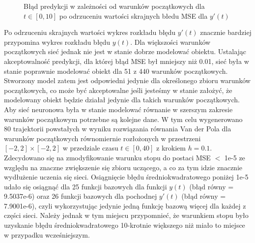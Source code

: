\begin{figure}[ht!]
	\centering

	

	\caption{Błąd predykcji w zależności od warunków początkowych dla $t \in [0,10]$ po odrzuceniu wartości skrajnych błedu MSE dla $y'(t)$}
	\label{img:err_initial_new}
\end{figure}

Po odrzuceniu skrajnych wartości wykres rozkładu błędu $y'(t)$ znacznie bardziej przypomina wykres rozkładu błędu $y(t)$. Dla większości warunków początkowych sieć jednak nie jest w stanie dobrze modelować obiektu. Ustalając akceptowalność predykcji, dla której błąd MSE był mniejszy niż 0.01, sieć była w stanie poprawnie modelować obiekt dla 51 z 440 warunków początkowych. Stworzony model zatem jest odpowiedni jedynie dla określonego zbioru warunków początkowych, co może być akceptowalne jeśli jesteśmy w stanie założyć, że modelowany obiekt będzie działał jedynie dla takich warunków początkowych. Aby sieć neuronowa była w stanie modelować równanie w szerszym zakresie warunków początkowym potrzebne są kolejne dane. W tym celu wygenerowano 80 trajektorii powstałych w wyniku rozwiązania równania Van der Pola dla warunków początkowych równomiernie rozłożonych w przestrzeni $[-2,2] \times [-2,2]$ w przedziale czasu $t \in [0, 40]$ z krokiem $h=0.1$. Zdecydowano się na zmodyfikowanie warunku stopu do postaci MSE $<$ 1e-5 ze względu na znaczne zwiększenie się zbioru uczącego, a co za tym idzie znacznie wydłużenie uczenia się sieci.
Osiągnięcie błędu średniokwadratowego poniżej 1e-5 udało się osiągnąć dla 25 funkcji bazowych dla funkcji $y(t)$ (błąd równy = 9.5037e-6) oraz 26 funkcji bazowych dla pochodnej $y'(t)$ (błąd równy = 7.9001e-6), czyli wykorzystując jedynie jedną funkcję bazową więcej dla każdej z części sieci. Należy jednak w tym miejscu przypomnieć, że warunkiem stopu było uzyskanie błędu średniokwadratowego 10-krotnie większego niż miało to miejsce w przypadku wcześniejszym. 

